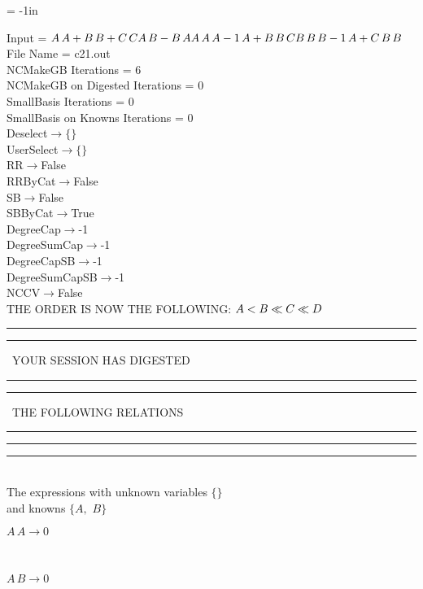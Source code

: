 \voffset = -1in
\evensidemargin 0.1in
\oddsidemargin 0.1in
\textheight 9in
\textwidth 6in

\normalsize
\baselineskip=12pt
\noindent
Input = 
$
\\A\,
 A + B\,
 B + C\,
 C\\
A\,
 B - B\,
 A\\
A\,
 A\,
 A\\
-1\,
 A + B\,
 B\,
 C\\
B\,
 B\,
 B\\
-1\,
 A + C\,
 B\,
 B\\
$
File Name = c21.out\\
NCMakeGB Iterations = 6\\
NCMakeGB on Digested Iterations = 0\\
SmallBasis Iterations = 0\\
SmallBasis on Knowns Iterations = 0\\
Deselect$\rightarrow \{\}$\\
UserSelect$\rightarrow \{\}$\\
RR$\rightarrow $False\\
RRByCat$\rightarrow $False\\
SB$\rightarrow $False\\
SBByCat$\rightarrow $True\\
DegreeCap$\rightarrow $-1\\
DegreeSumCap$\rightarrow $-1\\
DegreeCapSB$\rightarrow $-1\\
DegreeSumCapSB$\rightarrow $-1\\
NCCV$\rightarrow $False\\
THE ORDER IS NOW THE FOLLOWING:\hfil\break
$
A<B\ll
C\ll
D\\
$
\rule[2pt]{6in}{4pt}\hfil\break
\rule[2pt]{1.879in}{4pt}
\ YOUR SESSION HAS DIGESTED\ 
\rule[2pt]{1.879in}{4pt}\hfil\break
\rule[2pt]{1.923in}{4pt}
\ THE FOLLOWING RELATIONS\ 
\rule[2pt]{1.923in}{4pt}\hfil\break
\rule[2pt]{6in}{4pt}\hfil\break
\rule[3pt]{6in}{.7pt}\\
The expressions with unknown variables $\{\}$\\
and knowns $\{A,
$ $
B\}$\smallskip\\
\begin{minipage}{6in}
$
A\,
 A\rightarrow 0
$
\end{minipage}\medskip \\
\begin{minipage}{6in}
$
A\,
 B\rightarrow 0
$
\end{minipage}\medskip \\

